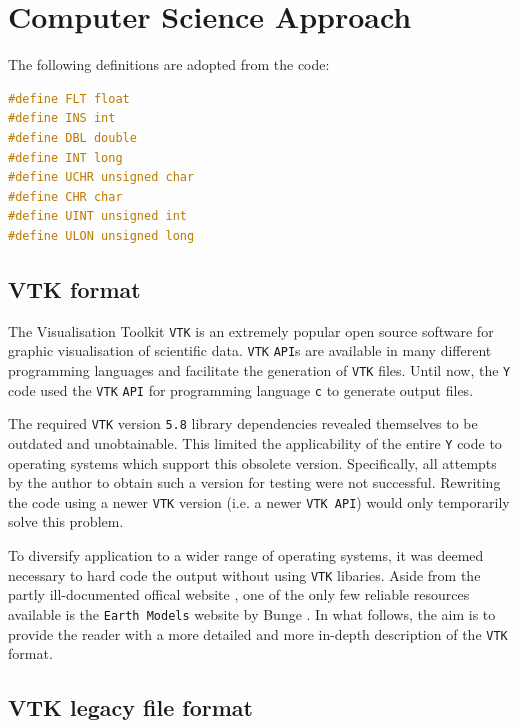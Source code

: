 \section{Computer Science Approach}
\label{sec:ComputerScienceApproach}


The following definitions are adopted from the code:

\begin{lstlisting}[language=C, caption=Data type definitions, label=lst:definitions]
#define FLT float
#define INS int
#define DBL double
#define INT long
#define UCHR unsigned char
#define CHR char
#define UINT unsigned int
#define ULON unsigned long
\end{lstlisting}

\subsection{VTK format}
\label{subsec:VTKformat}

The Visualisation Toolkit \texttt{VTK} \cite{Kit} is an extremely popular open source software for graphic visualisation of scientific data. \texttt{VTK} \texttt{API}s are available in many different programming languages and facilitate the generation of \texttt{VTK} files. Until now, the \texttt{Y} code used the \texttt{VTK} \texttt{API} for programming language \texttt{c} to generate output files.

\bigbreak
The required \texttt{VTK} version \texttt{5.8} library dependencies revealed themselves to be outdated and unobtainable. This limited the applicability of the entire \texttt{Y} code to operating systems which support this obsolete version. Specifically, all attempts by the author to obtain such a version for testing were not successful. Rewriting the code using a newer \texttt{VTK} version (i.e. a newer \texttt{VTK API}) would only temporarily solve this problem.

\bigbreak
To diversify application to a wider range of operating systems, it was deemed necessary to hard code the output without using \texttt{VTK} libaries. Aside from the partly ill-documented offical website \cite{Kit}, one of the only few reliable resources available is the \texttt{Earth Models} website by Bunge \cite{Bun09}. In what follows, the aim is to provide the reader with a more detailed and more in-depth description of the \texttt{VTK} format. 

\subsection{VTK legacy file format}
\label{subsec:VTKlegacyfileformat}

